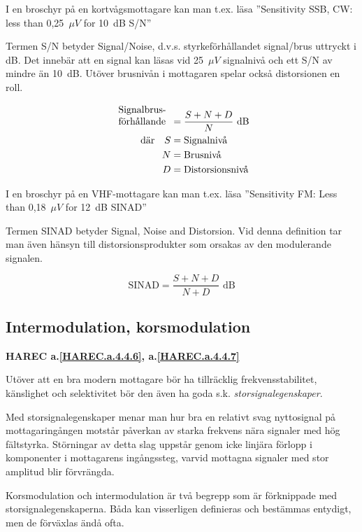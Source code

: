 I en broschyr på en kortvågsmottagare kan man t.ex. läsa
''Sensitivity SSB, CW: less than 0,25~\(\mu V\) for 10~dB S/N''

Termen S/N betyder Signal/Noise, d.v.s. styrkeförhållandet signal/brus
uttryckt i dB.
Det innebär att en signal kan läsas vid 25~\(\mu V\) signalnivå och ett S/N av mindre
än 10~dB.
Utöver brusnivån i mottagaren spelar också distorsionen en roll.

\begin{align*}
  \begin{array}[b]{l}
    \text{Signalbrus-} \\
    \text{förhållande}
  \end{array} &= \frac{S + N + D}{N} \text{ dB} \\
  \text{där} \quad S &= \text{Signalnivå} \\
  N &= \text{Brusnivå} \\
  D &= \text{Distorsionsnivå} \\
\end{align*}

I en broschyr på en VHF-mottagare kan man t.ex. läsa
''Sensitivity FM: Less than 0,18~\(\mu V\) for 12~dB SINAD''

Termen SINAD betyder Signal, Noise and Distorsion.
Vid denna definition tar man även hänsyn till distorsionsprodukter som orsakas
av den modulerande signalen.

\[
\text{SINAD} = \frac{S+N+D}{N+D}\text{ dB}
\]

\subsection{Intermodulation, korsmodulation}
\textbf{HAREC
  a.\ref{HAREC.a.4.4.6}\label{myHAREC.a.4.4.6},
  a.\ref{HAREC.a.4.4.7}\label{myHAREC.a.4.4.7}
}

Utöver att en bra modern mottagare bör ha tillräcklig frekvensstabilitet,
känslighet och selektivitet bör den även ha goda s.k.
\emph{storsignalegenskaper}.

Med storsignalegenskaper menar man hur bra en relativt svag nyttosignal på
mottagaringången motstår påverkan av starka frekvens nära signaler med hög
fältstyrka.
Störningar av detta slag uppstår genom icke linjära förlopp i komponenter i
mottagarens ingångssteg, varvid mottagna signaler med stor amplitud blir
förvrängda.

Korsmodulation och intermodulation är två begrepp som är förknippade
med storsignalegenskaperna.
Båda kan visserligen definieras och bestämmas entydigt, men de förväxlas ändå
ofta.

